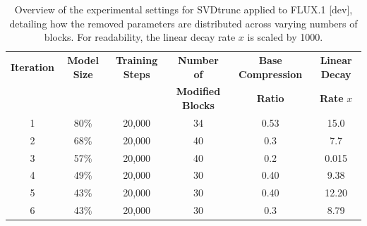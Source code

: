 \begin{table}[H]
	\centering
	\caption[SVDtrunc FLUX.1 {[dev]} Compression Details]{Overview of the experimental settings for SVDtrunc applied to FLUX.1 [dev], detailing how the removed parameters are distributed across varying numbers of blocks. For readability, the linear decay rate $x$ is scaled by 1000.}
	\label{tab:sup_training}
	\begin{tabular}{cccccc}
			\toprule
			\textbf{Iteration} &\textbf{Model Size} & \textbf{Training Steps} & \textbf{Number of} & \textbf{Base Compression} & \textbf{Linear Decay}\\
			&&&\textbf{Modified Blocks}&\textbf{Ratio}& \textbf{Rate} $x$\\
			\midrule
			1 & 80\% & 20,000 & 34 & 0.53 & 15.0 \\
			
			
			
			2 &  68\%&  20,000 & 40 & 0.3 & 7.7 \\
			
			
			
			
			3 & 57\% & 20,000 &  40 & 0.2 & 0.015 \\
			
			
			
			4 & 49\% & 20,000 &  30 & 0.40  & 9.38 \\
			
			
			
			5& 43\% &  20,000 & 30 & 0.40  & 12.20 \\
			
		
			
			6& 43\% &  20,000 & 30 & 0.3 & 8.79 \\
			
			
			
			\bottomrule
		\end{tabular}
\end{table}

